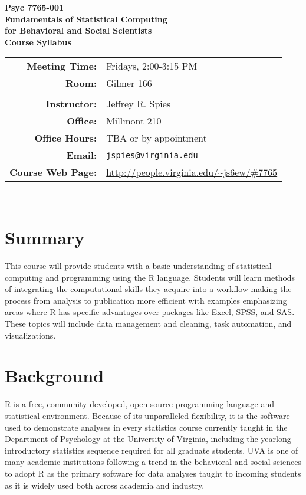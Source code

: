 \documentclass[11pt]{article}
\begin{document}
\begin{center}
{\LARGE \bf Psyc 7765-001 \\ 
Fundamentals of Statistical Computing\\for Behavioral and Social Scientists} \bigskip \\
{\Large \bf Course Syllabus} \\
\end{center}
\bigskip


{\parindent 0pt
\begin{tabular}{ r l  } 
{\bf Meeting Time:} & Fridays, 2:00-3:15 PM \\
{\bf Room:}         & Gilmer 166\\
                    & \\
{\bf Instructor:}   & Jeffrey R. Spies \\
{\bf Office:}       & Millmont 210 \\
{\bf Office Hours:} & TBA or by appointment \\
{\bf Email:}        & {\tt jspies@virginia.edu}  \\
{\bf Course Web Page:}     & \url{http://people.virginia.edu/~js6ew/#7765} \\
\end{tabular} \medskip \\
}

\section{Summary}

This course will provide students with a basic understanding of statistical computing and programming using the R language.  Students will learn methods of integrating the computational skills they acquire into a workflow making the process from analysis to publication more efficient with examples emphasizing areas where R has specific advantages over packages like Excel, SPSS, and SAS.  These topics will include data management and cleaning, task automation, and visualizations.

\section{Background}

R is a free, community-developed, open-source programming language and statistical environment. Because of its unparalleled flexibility, it is the software used to demonstrate analyses in every statistics course currently taught in the Department of Psychology at the University of Virginia, including the yearlong introductory statistics sequence required for all graduate students. UVA is one of many academic institutions following a trend in the behavioral and social sciences to adopt R as the primary software for data analyses taught to incoming students as it is widely used both across academia and industry.
\end{document}
